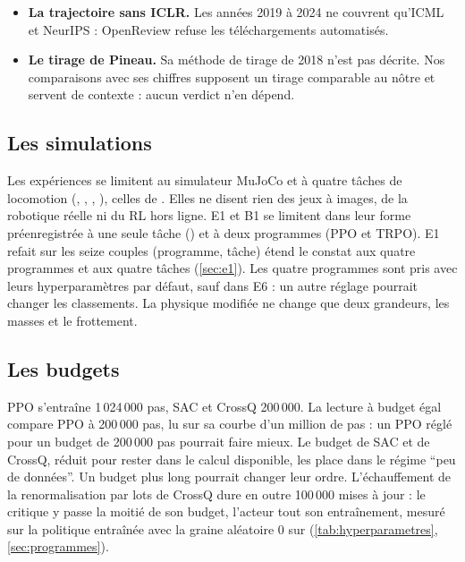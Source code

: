 \begin{itemize}
        $[+15\,;\,+51]$. Dans la lecture la plus défavorable, elle vaut encore $+30$ points,
        $[+11\,;\,+47]$, avec $p_{\text{Holm}} = 0{,}035$ (,
        \cref{sec:sr-robustesse}). L'asymétrie des versions existe, mais elle ne change que quatre
        à six articles de 2018 sur 48 : elle explique une part de l'écart entre notre Q5 de 2018 et
        celui de Pineau, pas le verdict.
  \item \textbf{La trajectoire sans ICLR.} Les années 2019 à 2024 ne couvrent qu'ICML et NeurIPS :
        OpenReview refuse les téléchargements automatisés.
  \item \textbf{Le tirage de Pineau.} Sa méthode de tirage de 2018 n'est pas décrite. Nos
        comparaisons avec ses chiffres supposent un tirage comparable au nôtre et servent de
        contexte : aucun verdict n'en dépend.
\end{itemize}

\subsection{Les simulations}

Les expériences se limitent au simulateur MuJoCo et à quatre tâches de locomotion
(, , , ), celles de
\textcite{henderson2018matters}. Elles ne disent rien des jeux à images, de la robotique réelle ni
du RL hors ligne. E1 et B1 se limitent dans leur forme préenregistrée à une seule tâche
() et à deux programmes (PPO et TRPO). E1 refait sur les seize couples
(programme, tâche) étend le constat aux quatre programmes et aux quatre tâches
(\cref{sec:e1}). Les quatre programmes sont pris avec leurs hyperparamètres par défaut, sauf dans E6 :
un autre réglage pourrait changer les classements. La physique modifiée ne change que deux grandeurs,
les masses et le frottement.

\subsection{Les budgets}

PPO s'entraîne 1\,024\,000 pas, SAC et CrossQ 200\,000. La
lecture à budget égal compare PPO à 200\,000 pas, lu sur sa courbe d'un million de
pas : un PPO réglé pour un budget de 200\,000 pas pourrait faire mieux. Le budget de SAC et de
CrossQ, réduit pour rester dans le calcul disponible, les place dans le régime \enquote{peu de données}. Un budget
plus long pourrait changer leur ordre. L'échauffement de la renormalisation par lots de CrossQ dure
en outre 100\,000 mises à jour : le critique y passe la moitié de son budget, l'acteur tout son
entraînement, mesuré sur la politique entraînée avec la graine aléatoire 0 sur  (\cref{tab:hyperparametres},
\cref{sec:programmes}).

